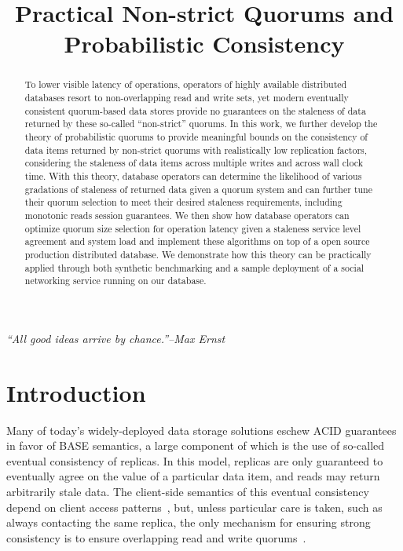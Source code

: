 \documentclass{vldb}
\title{Practical Non-strict Quorums and Probabilistic Consistency}
\begin{document}
\maketitle

\noindent\textit{``All good ideas arrive by chance.''--Max Ernst}

\begin{abstract}

To lower visible latency of operations, operators of highly available
distributed databases resort to non-overlapping read and write sets,
yet modern eventually consistent quorum-based data stores provide no
guarantees on the staleness of data returned by these so-called
“non-strict” quorums. In this work, we further develop the theory of
probabilistic quorums to provide meaningful bounds on the consistency
of data items returned by non-strict quorums with realistically low
replication factors, considering the staleness of data items across
multiple writes and across wall clock time. With this theory, database
operators can determine the likelihood of various gradations of
staleness of returned data given a quorum system and can further tune
their quorum selection to meet their desired staleness requirements,
including monotonic reads session guarantees. We then show how
database operators can optimize quorum size selection for operation
latency given a staleness service level agreement and system load and
implement these algorithms on top of a open source production
distributed database. We demonstrate how this theory can be
practically applied through both synthetic benchmarking and a sample
deployment of a social networking service running on our database.

\end{abstract}

\section{Introduction}


Many of today's widely-deployed data storage solutions eschew ACID
guarantees in favor of BASE semantics, a large component of which is
the use of so-called eventual consistency of replicas.  In this model,
replicas are only guaranteed to eventually agree on the value of a
particular data item, and reads may return arbitrarily stale data.
The client-side semantics of this eventual consistency depend on
client access patterns~\cite{vogels-defs}, but, unless particular care
is taken, such as always contacting the same replica, the only
mechanism for ensuring strong consistency is to ensure overlapping
read and write quorums~\cite{dynamo}.
\end{document}
